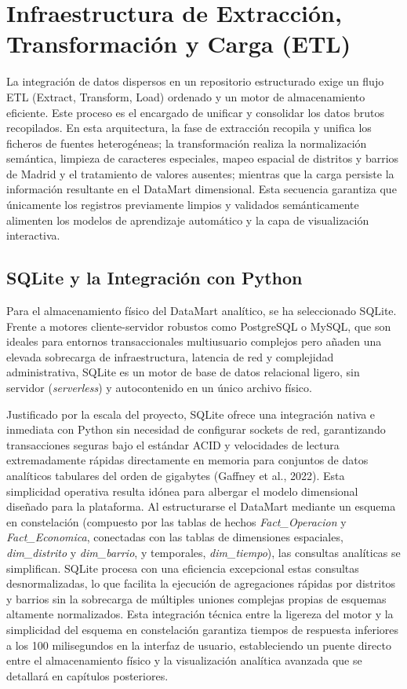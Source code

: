 \documentclass[a4paper,11pt,openany]{book}
\begin{document}
\section{Infraestructura de Extracción, Transformación y Carga (ETL)}
La integración de datos dispersos en un repositorio estructurado exige un flujo ETL (Extract, Transform, Load) ordenado y un motor de almacenamiento eficiente. Este proceso es el encargado de unificar y consolidar los datos brutos recopilados. En esta arquitectura, la fase de extracción recopila y unifica los ficheros de fuentes heterogéneas; la transformación realiza la normalización semántica, limpieza de caracteres especiales, mapeo espacial de distritos y barrios de Madrid y el tratamiento de valores ausentes; mientras que la carga persiste la información resultante en el DataMart dimensional. Esta secuencia garantiza que únicamente los registros previamente limpios y validados semánticamente alimenten los modelos de aprendizaje automático y la capa de visualización interactiva.

\subsection{SQLite y la Integración con Python}
Para el almacenamiento físico del DataMart analítico, se ha seleccionado SQLite. Frente a motores cliente-servidor robustos como PostgreSQL o MySQL, que son ideales para entornos transaccionales multiusuario complejos pero añaden una elevada sobrecarga de infraestructura, latencia de red y complejidad administrativa, SQLite es un motor de base de datos relacional ligero, sin servidor (\textit{serverless}) y autocontenido en un único archivo físico.

Justificado por la escala del proyecto, SQLite ofrece una integración nativa e inmediata con Python sin necesidad de configurar sockets de red, garantizando transacciones seguras bajo el estándar ACID y velocidades de lectura extremadamente rápidas directamente en memoria para conjuntos de datos analíticos tabulares del orden de gigabytes (Gaffney et al., 2022). Esta simplicidad operativa resulta idónea para albergar el modelo dimensional diseñado para la plataforma. Al estructurarse el DataMart mediante un esquema en constelación (compuesto por las tablas de hechos \textit{Fact\_Operacion} y \textit{Fact\_Economica}, conectadas con las tablas de dimensiones espaciales, \textit{dim\_distrito} y \textit{dim\_barrio}, y temporales, \textit{dim\_tiempo}), las consultas analíticas se simplifican. SQLite procesa con una eficiencia excepcional estas consultas desnormalizadas, lo que facilita la ejecución de agregaciones rápidas por distritos y barrios sin la sobrecarga de múltiples uniones complejas propias de esquemas altamente normalizados. Esta integración técnica entre la ligereza del motor y la simplicidad del esquema en constelación garantiza tiempos de respuesta inferiores a los 100 milisegundos en la interfaz de usuario, estableciendo un puente directo entre el almacenamiento físico y la visualización analítica avanzada que se detallará en capítulos posteriores.
\end{document}
